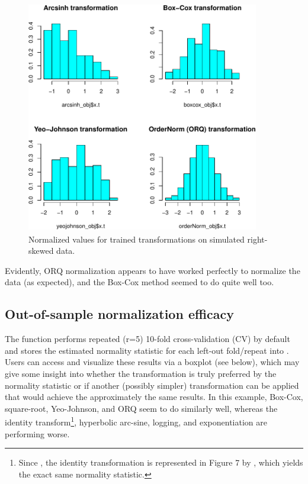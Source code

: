 \begin{Schunk}
\begin{figure}

{\centering \includegraphics[width=4in,height=4in]{figs/histtrans-1} 

}

\caption[Normalized values for trained transformations on simulated right-skewed data]{Normalized values for trained transformations on simulated right-skewed data.}\label{fig:histtrans}
\end{figure}
\end{Schunk}

Evidently, ORQ normalization appears to have worked perfectly to
normalize the data (as expected), and the Box-Cox method seemed to do
quite well too.

\hypertarget{out-of-sample-normalization-efficacy}{%
\subsection{Out-of-sample normalization
efficacy}\label{out-of-sample-normalization-efficacy}}

The  function performs repeated (r=5) 10-fold
cross-validation (CV) by default and stores the estimated normality
statistic for each left-out fold/repeat into
. Users can access and visualize these
results via a boxplot (see below), which may give some insight into
whether the transformation is truly preferred by the normality statistic
or if another (possibly simpler) transformation can be applied that
would achieve the approximately the same results. In this example,
Box-Cox, square-root, Yeo-Johnson, and ORQ seem to do similarly well,
whereas the identity
transform\footnote{Since , the identity transformation is represented in Figure 7 by , which yields the exact same normality statistic.},
hyperbolic arc-sine, logging, and exponentiation are performing worse.

